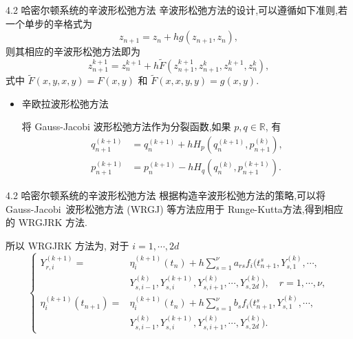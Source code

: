\documentclass{beamer}
\begin{document}
\begin{frame}{4.2 哈密尔顿系统的辛波形松弛方法}
\qquad 辛波形松弛方法的设计,可以遵循如下准则,若一个单步的辛格式为
\begin{equation*}
z_{n+1}=z_{n}+h g(z_{n+1},z_{n}),
\end{equation*}
则其相应的辛波形松弛方法即为
\begin{equation}\label{eq:discrete}
z_{n+1}^{k+1}=z_{n}^{k+1}+h \tilde{F}(z_{n+1}^{k+1},z_{n+1}^{k},z_{n}^{k+1},z_{n}^{k}),
\end{equation}
式中 $\tilde{F}(x,y,x,y)=F(x,y)$ 和 $\tilde{F}(x,x,y,y)=g(x,y)$.
\begin{itemize}
\item 辛欧拉波形松弛方法

将 Gauss-Jacobi 波形松弛方法作为分裂函数,如果 $p,q \in \mathbb{R}$, 有
\begin{equation}\label{eq:schemejacobi}
  \begin{aligned}
    q_{n+1}^{(k+1)}&=q_{n}^{(k+1)}+hH_{p}(q_{n}^{(k+1)},p_{n+1}^{(k)}),\\
    p_{n+1}^{(k+1)}&=p_{n}^{(k+1)}-hH_{q}(q_{n}^{(k)},p_{n+1}^{(k+1)}).
  \end{aligned}
\end{equation}
\end{itemize}
\end{frame}

\begin{frame}{4.2 哈密尔顿系统的辛波形松弛方法}
\qquad 根据构造辛波形松弛方法的策略,可以将 Gauss-Jacobi~波形松弛方法 (WRGJ) 等方法应用于 Runge-Kutta方法,得到相应的 WRGJRK 方法.

所以 WRGJRK 方法为, 对于 $i=1,\cdots,2d$
\begin{equation*}
  \left\lbrace
    \begin{aligned}
      Y_{r,i}^{(k+1)}=&\eta_{i}^{(k+1)}(t_{n})+h\sum_{s=1}^{\nu}a_{rs}f_i(t_{n+1}^{s},Y_{s,1}^{(k)},\cdots,\\
      &Y_{s,i-1}^{(k)},Y_{s,i}^{(k+1)},Y_{s,i+1}^{(k)},\cdots,Y_{s,2d}^{(k)}),\quad r=1,\cdots, \nu, \\
      \eta_{i}^{(k+1)}(t_{n+1})=&\eta_{i}^{(k+1)}(t_{n})+h\sum_{s=1}^{\nu}b_{s}f_i(t_{n+1}^{s},Y_{s,1}^{(k)},\cdots,\\
      &Y_{s,i-1}^{(k)},Y_{s,i}^{(k+1)},Y_{s,i+1}^{(k)},\cdots,Y_{s,2d}^{(k)}).
    \end{aligned}
  \right.
\end{equation*}
\end{frame}
\end{document}
